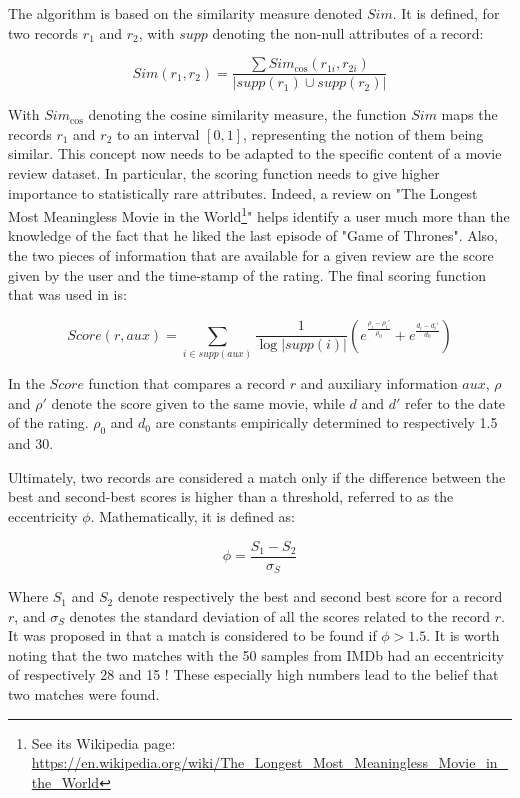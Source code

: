 The algorithm is based on the similarity measure denoted $Sim$. It is defined, for two records $r_1$ and $r_2$, with $supp$ denoting the non-null attributes of a record:

\begin{equation}
	Sim(r_1, r_2) = \frac{\sum Sim_{\text{cos}}(r_{1i}, r_{2i})}{\lvert supp(r_1) \cup supp(r_2) \rvert}
\end{equation} 

With $Sim_{\text{cos}}$ denoting the cosine similarity measure, the function $Sim$ maps the records $r_1$ and $r_2$ to an interval $[0,1]$, representing the notion of them being similar. This concept now needs to be adapted to the specific content of a movie review dataset. In particular, the scoring function needs to give higher importance to statistically rare attributes. Indeed, a review on "The Longest Most Meaningless Movie in the World\footnote{See its Wikipedia page: \url{https://en.wikipedia.org/wiki/The_Longest_Most_Meaningless_Movie_in_the_World}}" helps identify a user much more than the knowledge of the fact that he liked the last episode of "Game of Thrones". Also, the two pieces of information that are available for a given review are the score given by the user and the time-stamp of the rating. The final scoring function that was used in \cite{netflix} is:

\begin{equation}\label{eq:score}
	Score(r,aux) = \sum_{i \in supp(aux)} \frac{1}{\log\lvert supp(i) \rvert} \left( e^{\frac{\rho_i - \rho_i' }{\rho_0}} + e^{\frac{d_i - d_i' }{d_0}}\right)
\end{equation}

In the $Score$ function that compares a record $r$ and auxiliary information $aux$, $\rho$ and $\rho'$ denote the score given to the same movie, while $d$ and $d'$ refer to the date of the rating. $\rho_0$ and $d_0$ are constants empirically determined to respectively 1.5 and 30.

Ultimately, two records are considered a match only if the difference between the best and second-best scores is higher than a threshold, referred to as the eccentricity $\phi$. Mathematically, it is defined as:

\begin{equation}
	\phi = \frac{S_1-S_2}{\sigma_S}
\end{equation}

Where $S_1$ and $S_2$ denote respectively the best and second best score for a record $r$, and $\sigma_S$ denotes the standard deviation of all the scores related to the record $r$. It was proposed in \cite{netflix} that a match is considered to be found if $\phi > 1.5$. It is worth noting that the two matches with the 50 samples from IMDb had an eccentricity of respectively 28 and 15 ! These especially high numbers lead to the belief that two matches were found.


